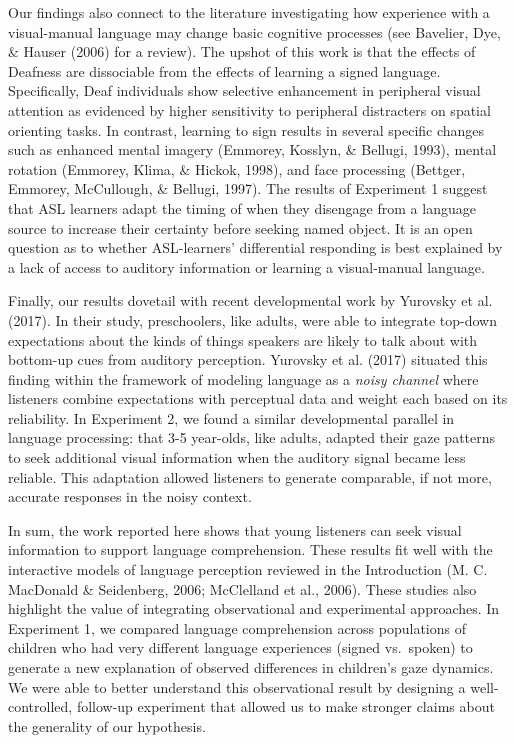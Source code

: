 \documentclass[oneside]{report}
\begin{document}
Our findings also connect to the literature investigating how experience
with a visual-manual language may change basic cognitive processes (see
Bavelier, Dye, \& Hauser (2006) for a review). The upshot of this work
is that the effects of Deafness are dissociable from the effects of
learning a signed language. Specifically, Deaf individuals show
selective enhancement in peripheral visual attention as evidenced by
higher sensitivity to peripheral distracters on spatial orienting tasks.
In contrast, learning to sign results in several specific changes such
as enhanced mental imagery (Emmorey, Kosslyn, \& Bellugi, 1993), mental
rotation (Emmorey, Klima, \& Hickok, 1998), and face processing
(Bettger, Emmorey, McCullough, \& Bellugi, 1997). The results of
Experiment 1 suggest that ASL learners adapt the timing of when they
disengage from a language source to increase their certainty before
seeking named object. It is an open question as to whether ASL-learners'
differential responding is best explained by a lack of access to
auditory information or learning a visual-manual language.

Finally, our results dovetail with recent developmental work by Yurovsky
et al. (2017). In their study, preschoolers, like adults, were able to
integrate top-down expectations about the kinds of things speakers are
likely to talk about with bottom-up cues from auditory perception.
Yurovsky et al. (2017) situated this finding within the framework of
modeling language as a \emph{noisy channel} where listeners combine
expectations with perceptual data and weight each based on its
reliability. In Experiment 2, we found a similar developmental parallel
in language processing: that 3-5 year-olds, like adults, adapted their
gaze patterns to seek additional visual information when the auditory
signal became less reliable. This adaptation allowed listeners to
generate comparable, if not more, accurate responses in the noisy
context.

In sum, the work reported here shows that young listeners can seek
visual information to support language comprehension. These results fit
well with the interactive models of language perception reviewed in the
Introduction (M. C. MacDonald \& Seidenberg, 2006; McClelland et al.,
2006). These studies also highlight the value of integrating
observational and experimental approaches. In Experiment 1, we compared
language comprehension across populations of children who had very
different language experiences (signed vs.~spoken) to generate a new
explanation of observed differences in children's gaze dynamics. We were
able to better understand this observational result by designing a
well-controlled, follow-up experiment that allowed us to make stronger
claims about the generality of our hypothesis.
\end{document}
